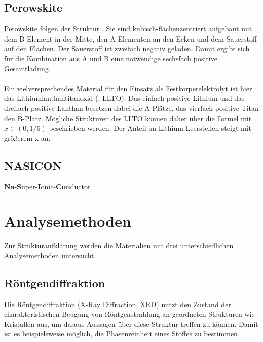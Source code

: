 \documentclass[a4paper, 11pt, headsepline,footsepline,twoside,abstract]{scrbook}
\begin{document}
\subsection{Perowskite}
Perowskite folgen der Struktur . Sie sind kubisch-flächenzentriert aufgebaut mit dem B-Element in der Mitte, den A-Elementen an den Ecken und dem Sauerstoff auf den Flächen. Der Sauerstoff ist zweifach negativ geladen. Damit ergibt sich für die Kombination aus A und B eine notwendige sechsfach positive Gesamtladung. %
\\\\
Ein vielversprechendes Material für den Einsatz als Festkörperelektrolyt ist hier das Lithiumlanthantitanoxid (, LLTO). Das einfach positive Lithium und das dreifach positive Lanthan besetzen dabei die A-Plätze, das vierfach positive Titan den B-Platz. Mögliche Strukturen des LLTO können daher über die Formel  mit $x \in (0, 1/6)$ beschrieben werden. Der Anteil an Lithium-Leerstellen steigt mit größerem x an.
\subsection{NASICON}
\textbf{Na}-\textbf{S}uper-\textbf{I}onic-\textbf{Con}ductor
\section{Analysemethoden}
Zur Strukturaufklärung werden die Materialien mit drei unterschiedlichen Analysemethoden untersucht.
\subsection{Röntgendiffraktion}
Die Röntgendiffraktion (X-Ray Diffraction, XRD) nutzt den Zustand der charakteristischen Beugung von Röntgenstrahlung an geordneten Strukturen wie Kristallen aus, um daraus Aussagen über diese Struktur treffen zu können. Damit ist es beispielsweise möglich, die Phasenreinheit eines Stoffes zu bestimmen.
\end{document}
